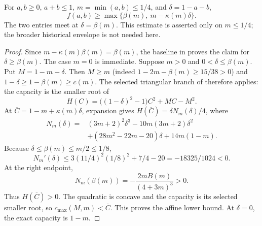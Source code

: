 \begin{lemma}
\label{lem:bc-slack-envelope}
For $a,b\ge0$, $a+b\le1$, $m=\min(a,b)\le1/4$, and $\delta=1-a-b$,
\[
 f(a,b)\ge\max\{\beta(m),\ m-\kappa(m)\delta\}.
\]
The two entries meet at $\delta=\beta(m)$. This estimate is asserted only
on $m\le1/4$; the broader historical envelope is not needed here.
\end{lemma}
\begin{proof}
Since $m-\kappa(m)\beta(m)=\beta(m)$, the baseline in
 proves the claim for $\delta\ge\beta(m)$.
The case $m=0$ is immediate. Suppose $m>0$ and $0<\delta\le\beta(m)$.
Put $M=1-m-\delta$. Then $M\ge m$ (indeed
$1-2m-\beta(m)\ge15/38>0$) and $1-\delta\ge1-\beta(m)\ge c(m)$.
The selected triangular branch of 
therefore applies: the capacity is the smaller root of
\[
 H(C)=\bigl((1-\delta)^2-1\bigr)C^2+MC-M^2.
\]
At $\overline C=1-m+\kappa(m)\delta$, expansion gives
$H(\overline C)=\delta N_m(\delta)/4$, where
\[
\begin{split}
 N_m(\delta)={}&(3m+2)^2\delta^3-10m(3m+2)\delta^2\\
 &+(28m^2-22m-20)\delta+14m(1-m).
\end{split}
\]
Because $\delta\le\beta(m)\le m/2\le1/8$,
\[
 N_m'(\delta)\le3(11/4)^2(1/8)^2+7/4-20=-18325/1024<0.
\]
At the right endpoint,
\[
 N_m(\beta(m))=-\frac{2mB(m)}{(4+3m)^3}>0.
\]
Thus $H(\overline C)>0$. The quadratic is concave and the capacity is
its selected smaller root, so $c_{\max}(M,m)<\overline C$. This proves
the affine lower bound. At $\delta=0$, the exact capacity is $1-m$.
\end{proof}

